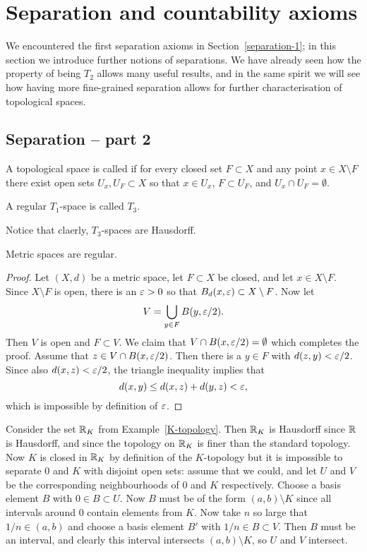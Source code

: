 \section{Separation and countability axioms}
\label{separation}
We encountered the first separation axioms in Section~\ref{separation-1}; in this section we introduce further notions of separations. We have already seen how the property of being $T_2$ allows many useful results, and in the same spirit we will see how having more fine-grained separation allows for further characterisation of topological spaces.
\subsection{Separation -- part 2}
\begin{defn}
  A topological space is called  if for every closed set $F \subset X$ and any point $x \in X \setminus F$ there exist open sets $U_x, U_F \subset X$ so that $x \in U_x$, $F \subset U_F$, and $U_x \cap U_F = \emptyset$.
  
  A regular $T_1$-space is called $T_3$.
\end{defn}
Notice that claerly, $T_3$-spaces are Hausdorff.
\begin{prop}
  Metric spaces are regular.
\end{prop}
\begin{proof}
  Let $(X,d)$ be a metric space, let $F \subset X$ be closed, and let $x \in X \setminus F$. Since $X \setminus F$ is open, there is an $\varepsilon > 0$ so that $B_d(x,\varepsilon) \subset X \setminus F$. Now let
  \[
    V = \bigcup_{y \in F} B(y,\varepsilon/2).
  \]
  Then $V$ is open and $F \subset V$. We claim that $V \cap B(x,\varepsilon/2) = \emptyset$ which completes the proof. Assume that $z \in V \cap B(x,\varepsilon/2)$. Then there is a $y \in F$ with $d(z,y) < \varepsilon/2$. Since also $d(x,z) < \varepsilon/2$, the triangle inequality implies that
  \[
    d(x,y) \leq d(x,z) + d(y,z) < \varepsilon,
  \]
  which is impossible by definition of $\varepsilon$.
\end{proof}
\begin{example}
  Consider the set $\mathbb{R}_K$ from Example~\ref{K-topology}. Then $\mathbb{R}_K$ is Hausdorff since $\mathbb{R}$ is Hausdorff, and since the topology on $\mathbb{R}_K$ is finer than the standard topology. Now $K$ is closed in $\mathbb{R}_K$ by definition of the $K$-topology but it is impossible to separate $0$ and $K$ with disjoint open sets: assume that we could, and let $U$ and $V$ be the corresponding neighbourhoods of $0$ and $K$ respectively. Choose a basis element $B$ with $0 \in B \subset U$. Now $B$ must be of the form $(a,b) \setminus K$ since all intervals around $0$ contain elements from $K$. Now take $n$ so large that $1/n \in (a,b)$ and choose a basis element $B'$ with $1/n \in B \subset V$. Then $B$ must be an interval, and clearly this interval intersects $(a,b) \setminus K$, so $U$ and $V$ intersect.
\end{example}
